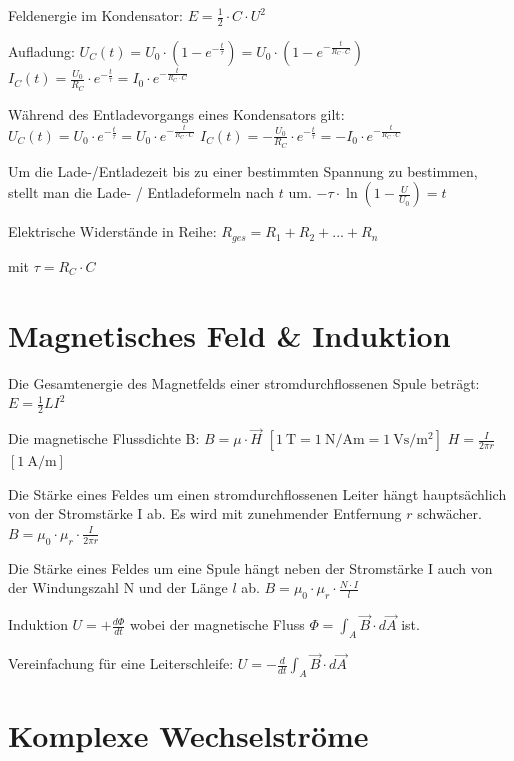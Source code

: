 \documentclass{article}
\begin{document}
	Feldenergie im Kondensator:
	$E=\frac{1}{2}\cdot C\cdot U^{2}$
	
	Aufladung:
	$U_{C}(t)=U_{0}\cdot(1-e^{-\frac{t}{\tau}})=U_{0}\cdot(1-e^{-\frac{t}{R_{C}\cdot C}})$
	$I_{C}(t)=\frac{U_{0}}{R_{C}}\cdot e^{-\frac{t}{\tau}}=I_{0}\cdot e^{-\frac{t}{R_{C}\cdot C}}$
	
	Während des Entladevorgangs eines Kondensators gilt:
	$U_{C}(t)=U_{0}\cdot e^{-\frac{t}{\tau}}=U_{0}\cdot e^{-\frac{t}{R_{C}\cdot C}}$
	$I_{C}(t)=-\frac{U_{0}}{R_{C}}\cdot e^{-\frac{t}{\tau}}=-I_{0}\cdot e^{-\frac{t}{R_{C}\cdot C}}$
	
	Um die Lade-/Entladezeit bis zu einer bestimmten Spannung zu bestimmen, stellt man die Lade- / Entladeformeln nach $t$ um.
	$-\tau\cdot \ln\left(1-\frac{U}{U_{0}}\right)=t$
	
	Elektrische Widerstände in Reihe:
	$R_{ges}=R_{1}+R_{2}+...+R_{n}$
	
	mit
	$\tau=R_{C}\cdot C$
	
	\section{Magnetisches Feld \& Induktion}
	
	Die Gesamtenergie des Magnetfelds einer stromdurchflossenen Spule beträgt:
	$E=\frac{1}{2}LI^{2}$
	
	Die magnetische Flussdichte B:
	$B=\mu\cdot\vec{H}$
	$\left[\SI{1}{\tesla}=\SI{1}{\newton\per\ampere\meter}=\SI{1}{\volt\second\per\meter\squared}\right]$
	$H=\frac{I}{2\pi r}$ $\left[\SI{1}{\ampere\per\meter}\right]$
	
	Die Stärke eines Feldes um einen stromdurchflossenen Leiter hängt hauptsächlich von der Stromstärke I ab.
	Es wird mit zunehmender Entfernung $r$ schwächer.
	$B=\mu_{0}\cdot\mu_{r}\cdot\frac{I}{2\pi r}$
	
	Die Stärke eines Feldes um eine Spule hängt neben der Stromstärke I auch von der Windungszahl N und der Länge $l$ ab.
	$B=\mu_{0}\cdot\mu_{r}\cdot\frac{N\cdot I}{l}$
	
	Induktion
	$U=+\frac{d\Phi}{dt}$
	wobei der magnetische Fluss
	$\Phi=\int_{A}\vec{B}\cdot d\vec{A}$
	ist.
	
	Vereinfachung für eine Leiterschleife:
	$U=-\frac{d}{dt}\int_{A}\vec{B}\cdot d\vec{A}$
	
	\section{Komplexe Wechselströme}
	
\end{document}
